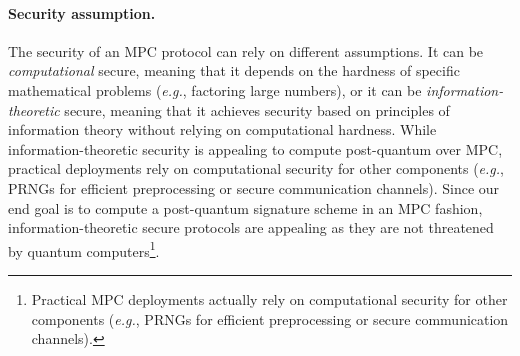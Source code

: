 \paragraph{Security assumption.}
The security of an MPC protocol can rely on different assumptions. It can be \textit{computational} secure, meaning that it depends on the hardness of specific mathematical problems (\textit{e.g.}, factoring large numbers), or it can be \textit{information-theoretic} secure, meaning that it achieves security based on principles of information theory without relying on computational hardness.
While information-theoretic security is appealing to compute post-quantum over MPC, practical deployments rely on computational security for other components (\textit{e.g.}, PRNGs for efficient preprocessing or secure communication channels). 
Since our end goal is to compute a post-quantum signature scheme in an MPC fashion, information-theoretic secure protocols are appealing as they are not threatened by quantum computers\footnote{Practical MPC deployments actually rely on computational security for other components (\textit{e.g.}, PRNGs for efficient preprocessing or secure communication channels).}. 

